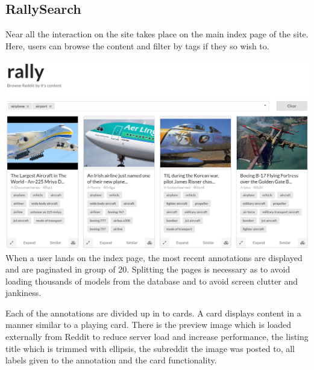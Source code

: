 \documentclass[msc,oneside]{ubcthesis}%
\begin{document}
\subsection{RallySearch}
Near all the interaction on the site takes place on the main index page of the site. Here, users can browse the content and filter by tags if they so wish to.

\includegraphics[width=\textwidth]{rallyindexpage.png}
When a user lands on the index page, the most recent annotations are displayed and are paginated in group of 20. Splitting the pages is necessary as to avoid loading thousands of models from the database and to avoid screen clutter and jankiness.
\par
Each of the annotations are divided up in to cards. A card displays content in a manner similar to a playing card. There is the preview image which is loaded externally from Reddit to reduce server load and increase performance, the listing title which is trimmed with ellipsis, the subreddit the image was posted to, all labels given to the annotation and the card functionality.
\end{document}
